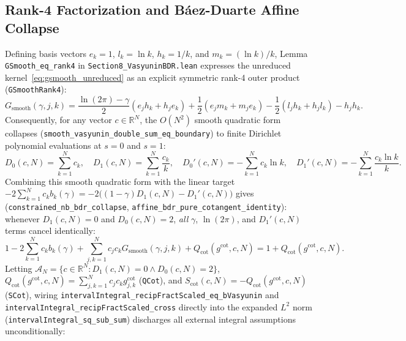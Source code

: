 \documentclass[11pt,a4paper]{article}
\theoremstyle{definition}
\newcommand{\Rset}{\mathbb{R}}
\begin{document}
\subsection{Rank-4 Factorization and B\'aez-Duarte Affine Collapse}

Defining basis vectors $e_k = 1$, $l_k = \ln k$, $h_k = 1/k$, and $m_k = (\ln k)/k$, Lemma \texttt{GSmooth\_\allowbreak eq\_\allowbreak rank4} in \texttt{Section8\_\allowbreak VasyuninBDR.lean} expresses the unreduced kernel~\eqref{eq:gsmooth_unreduced} as an explicit symmetric rank-4 outer product (\texttt{GSmoothRank4}):
\begin{equation}
G_{\mathrm{smooth}}(\gamma, j, k) = \frac{\ln(2\pi)-\gamma}{2}(e_j h_k + h_j e_k) + \frac{1}{2}(e_j m_k + m_j e_k) - \frac{1}{2}(l_j h_k + h_j l_k) - h_j h_k.
\end{equation}
Consequently, for any vector $c \in \Rset^N$, the $O(N^2)$ smooth quadratic form collapses (\texttt{smooth\_\allowbreak vasyunin\_\allowbreak double\_\allowbreak sum\_\allowbreak eq\_\allowbreak boundary}) to finite Dirichlet polynomial evaluations at $s = 0$ and $s = 1$:
\begin{equation}
D_0(c, N) = \sum_{k=1}^N c_k, \quad D_1(c, N) = \sum_{k=1}^N \frac{c_k}{k}, \quad D_0'(c, N) = -\sum_{k=1}^N c_k \ln k, \quad D_1'(c, N) = -\sum_{k=1}^N \frac{c_k \ln k}{k}.
\end{equation}
Combining this smooth quadratic form with the linear target $-2\sum_{k=1}^N c_k b_k(\gamma) = -2\big((1-\gamma)D_1(c,N) - D_1'(c,N)\big)$ gives (\texttt{constrained\_\allowbreak nb\_\allowbreak bdr\_\allowbreak collapse}, \texttt{affine\_\allowbreak bdr\_\allowbreak pure\_\allowbreak cotangent\_\allowbreak identity}): whenever $D_1(c, N) = 0$ and $D_0(c, N) = 2$, \emph{all} $\gamma$, $\ln(2\pi)$, and $D_1'(c,N)$ terms cancel identically:
\begin{equation}
1 - 2\sum_{k=1}^N c_k b_k(\gamma) + \sum_{j,k=1}^N c_j c_k G_{\mathrm{smooth}}(\gamma, j, k) + Q_{\mathrm{cot}}(g^{\mathrm{cot}}, c, N) = 1 + Q_{\mathrm{cot}}(g^{\mathrm{cot}}, c, N).
\end{equation}
Letting $\mathcal{A}_N = \{c \in \Rset^N : D_1(c, N) = 0 \land D_0(c, N) = 2\}$, $Q_{\mathrm{cot}}(g^{\mathrm{cot}}, c, N) = \sum_{j,k=1}^N c_j c_k g_{j,k}^{\mathrm{cot}}$ (\texttt{QCot}), and $S_{\mathrm{cot}}(c, N) = -Q_{\mathrm{cot}}(g^{\mathrm{cot}}, c, N)$ (\texttt{SCot}), wiring \texttt{intervalIntegral\_\allowbreak recipFractScaled\_\allowbreak eq\_\allowbreak bVasyunin} and \texttt{intervalIntegral\_\allowbreak recipFractScaled\_\allowbreak cross} directly into the expanded $L^2$ norm (\texttt{intervalIntegral\_\allowbreak sq\_\allowbreak sub\_\allowbreak sum}) discharges all external integral assumptions unconditionally:
\end{document}

